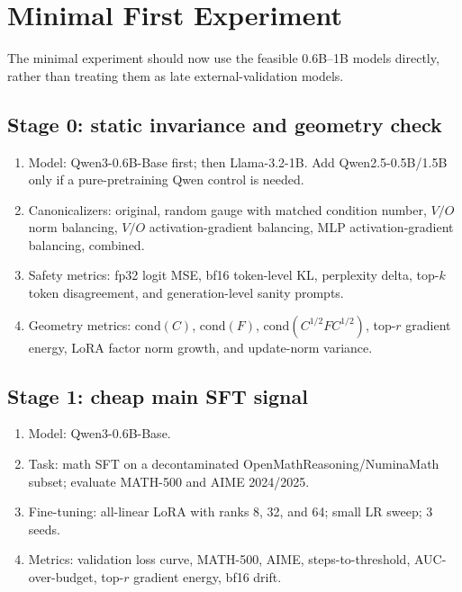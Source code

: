 \documentclass[11pt]{article}
\newcommand{\cond}{\mathrm{cond}}
\begin{document}
\section{Minimal First Experiment}

The minimal experiment should now use the feasible 0.6B--1B models directly, rather than treating them as late external-validation models.

\subsection{Stage 0: static invariance and geometry check}

\begin{enumerate}[leftmargin=*]
    \item Model: Qwen3-0.6B-Base first; then Llama-3.2-1B. Add Qwen2.5-0.5B/1.5B only if a pure-pretraining Qwen control is needed.
    \item Canonicalizers: original, random gauge with matched condition number, $V/O$ norm balancing, $V/O$ activation-gradient balancing, MLP activation-gradient balancing, combined.
    \item Safety metrics: fp32 logit MSE, bf16 token-level KL, perplexity delta, top-$k$ token disagreement, and generation-level sanity prompts.
    \item Geometry metrics: $\cond(C)$, $\cond(F)$, $\cond(C^{1/2}FC^{1/2})$, top-$r$ gradient energy, LoRA factor norm growth, and update-norm variance.
\end{enumerate}

\subsection{Stage 1: cheap main SFT signal}

\begin{enumerate}[leftmargin=*]
    \item Model: Qwen3-0.6B-Base.
    \item Task: math SFT on a decontaminated OpenMathReasoning/NuminaMath subset; evaluate MATH-500 and AIME 2024/2025.
    \item Fine-tuning: all-linear LoRA with ranks 8, 32, and 64; small LR sweep; 3 seeds.
    \item Metrics: validation loss curve, MATH-500, AIME, steps-to-threshold, AUC-over-budget, top-$r$ gradient energy, bf16 drift.
\end{enumerate}
\end{document}
